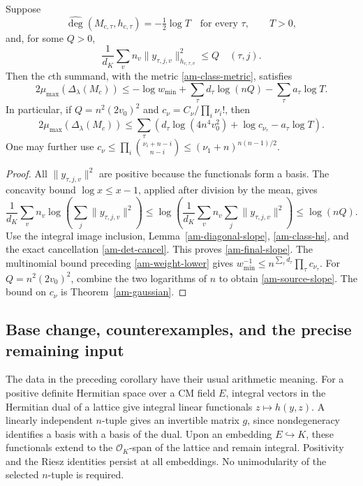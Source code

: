 \begin{corollary}\label{am-short}
Suppose
\[
 \widehat{\deg}(M_{c,\tau},h_{c,\tau})=-\tfrac12\log T
 \quad\text{for every $\tau$},\qquad T>0,
\]
and, for some $Q>0$,
\begin{equation}\label{am-short-assumption}
        \frac1{d_K}\sum_v n_v\|y_{\tau,j,v}\|_{h_{c,\tau,v}}^2
                                      \le Q\quad(\tau,j).
\end{equation}
Then the $c$th summand, with the metric \eqref{am-class-metric}, satisfies
\begin{equation}\label{am-final-slope}
 2\mu_{\max}(\Delta_\lambda(M_c))
 \le-\log w_{\min}+\sum_\tau d_\tau\log(nQ)
                                      -\sum_\tau a_\tau\log T.
\end{equation}
In particular, if $Q=n^2(2v_0)^2$ and
$c_{\nu}=C_\nu/\prod_i\nu_i!$, then
\begin{equation}\label{am-source-slope}
 2\mu_{\max}(\Delta_\lambda(M_c))
 \le\sum_\tau\left(
       d_\tau\log(4n^4v_0^2)+\log c_{\nu_\tau}-a_\tau\log T\right).
\end{equation}
One may further use
$c_\nu\le\prod_i\binom{\nu_i+n-i}{n-i}
\le(\nu_1+n)^{n(n-1)/2}$.
\end{corollary}
\begin{proof}
All $\|y_{\tau,j,v}\|^2$ are positive because the functionals form a
basis. The concavity bound $\log x\le x-1$, applied after division by
the mean, gives
\[
 \frac1{d_K}\sum_v n_v\log\left(\sum_j\|y_{\tau,j,v}\|^2\right)
 \le\log\left(\frac1{d_K}\sum_v n_v\sum_j\|y_{\tau,j,v}\|^2\right)
 \le\log(nQ).
\]
Use the integral image inclusion, Lemma~\ref{am-diagonal-slope},
\eqref{am-class-hs}, and the exact cancellation \eqref{am-det-cancel}.
This proves \eqref{am-final-slope}.
The multinomial bound preceding \eqref{am-weight-lower} gives
$w_{\min}^{-1}\le n^{\sum_\tau d_\tau}\prod_\tau c_{\nu_\tau}$.
For $Q=n^2(2v_0)^2$, combine the two logarithms of $n$ to obtain
\eqref{am-source-slope}. The bound on $c_\nu$ is
Theorem~\ref{am-gaussian}.
\end{proof}

\subsection{Base change, counterexamples, and the precise remaining input}

The data in the preceding corollary have their usual arithmetic meaning.
For a positive definite Hermitian space over a CM field $E$, integral
vectors in the Hermitian dual of a lattice give integral linear
functionals $z\mapsto h(y,z)$. A linearly independent $n$-tuple gives
an invertible matrix $g$, since nondegeneracy identifies a basis with
a basis of the dual. Upon an embedding $E\hookrightarrow K$, these
functionals extend to the $\mathcal O_K$-span of the lattice and remain
integral. Positivity and the Riesz identities persist at all embeddings.
No unimodularity of the selected $n$-tuple is required.

